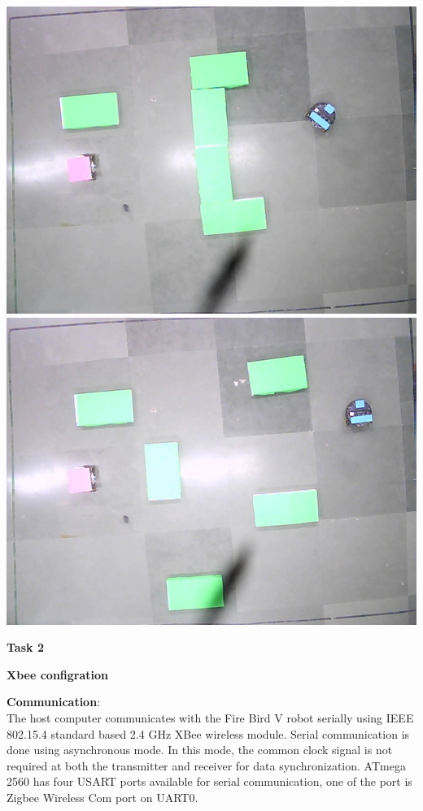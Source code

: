 \documentclass[report]{res}
\begin{document}
	\begin{center}
		\includegraphics[scale = 0.7]{graphics/case1/cap_image.jpeg}\\
		\includegraphics[scale = 0.7]{graphics/case2/cap_image.jpeg}\\
	\end{center}
	
	\pagebreak
	
	\begin{center}
		\textbf{\Huge Task 2} \\
	\end{center}
	\begin{center}
		\textbf{\huge Xbee configration} \\
	\end{center}
	\textbf{\large Communication}: \\
	The host computer communicates with the Fire Bird V robot serially using IEEE 802.15.4 standard based 2.4 GHz XBee wireless module. Serial communication is done using asynchronous mode. In this mode, the common clock signal is not required at both the transmitter and receiver for data synchronization. 
	ATmega 2560 has four USART ports available for serial communication, one of the port is Zigbee Wireless Com port on UART0. \\
	
\end{document}
